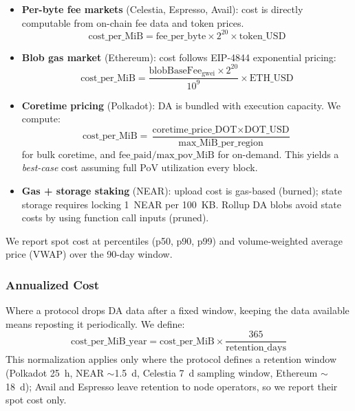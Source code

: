 \begin{itemize}
    \item \textbf{Per-byte fee markets} (Celestia, Espresso, Avail): cost is directly computable from on-chain fee data and token prices.
    \begin{equation}
        \text{cost\_per\_MiB} = \text{fee\_per\_byte} \times 2^{20} \times \text{token\_USD}
    \end{equation}

    \item \textbf{Blob gas market} (Ethereum): cost follows EIP-4844 exponential pricing:
    \begin{equation}
        \text{cost\_per\_MiB} = \frac{\text{blobBaseFee}_{\text{gwei}} \times 2^{20}}{10^{9}} \times \text{ETH\_USD}
    \end{equation}

    \item \textbf{Coretime pricing} (Polkadot): DA is bundled with execution capacity. We compute:
    \begin{equation}
        \text{cost\_per\_MiB} = \frac{\text{coretime\_price\_DOT} \times \text{DOT\_USD}}{\text{max\_MiB\_per\_region}}
    \end{equation}
    for bulk coretime, and $\text{fee\_paid} / \text{max\_pov\_MiB}$ for on-demand.
    This yields a \emph{best-case} cost assuming full PoV utilization every block.

    \item \textbf{Gas + storage staking} (NEAR): upload cost is gas-based (burned); state storage requires locking 1~NEAR per 100~KB. Rollup DA blobs avoid state costs by using function call inputs (pruned).
\end{itemize}

We report spot cost at percentiles (p50, p90, p99) and volume-weighted average price (VWAP) over the 90-day window.

\subsubsection{Annualized Cost}

Where a protocol drops DA data after a fixed window, keeping the data available means reposting it periodically.
We define:
\begin{equation}
    \text{cost\_per\_MiB\_year} = \text{cost\_per\_MiB} \times \frac{365}{\text{retention\_days}}
\end{equation}
This normalization applies only where the protocol defines a retention window (Polkadot 25~h, NEAR $\sim$1.5~d, Celestia 7~d sampling window, Ethereum $\sim$18~d); Avail and Espresso leave retention to node operators, so we report their spot cost only.

